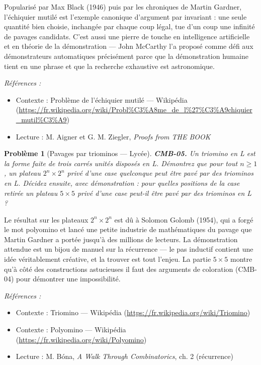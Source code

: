 \documentclass[11pt]{article}
\newtheorem{problem}{Problème}
\newenvironment{refs}{\par\small\noindent\emph{Références :}\begin{itemize}\setlength\itemsep{0pt}}{\end{itemize}\normalsize}
\begin{document}
\noindent Popularisé par Max Black (1946) puis par les chroniques de Martin Gardner,
l'échiquier mutilé est l'exemple canonique d'argument par invariant : une seule quantité bien
choisie, inchangée par chaque coup légal, tue d'un coup une infinité de pavages candidats. C'est
aussi une pierre de touche en intelligence artificielle et en théorie de la démonstration --- John
McCarthy l'a proposé comme défi aux démonstrateurs automatiques précisément parce que la
démonstration humaine tient en une phrase et que la recherche exhaustive est astronomique.

\begin{refs}
\item Contexte : Problème de l'échiquier mutilé --- Wikipédia (\url{https://fr.wikipedia.org/wiki/Probl%C3%A8me_de_l%27%C3%A9chiquier_mutil%C3%A9})
\item Lecture : M. Aigner et G. M. Ziegler, \textit{Proofs from THE BOOK}
\end{refs}

\bigskip

\begin{problem}[{Pavages par triominos --- Lycée}]
\textbf{CMB-05.} Un triomino en L est la forme faite de trois carrés unités
disposés en L. Démontrez que pour tout $ n \ge 1 $, un plateau $ 2^n \times 2^n $ privé d'une
case quelconque peut être pavé par des triominos en L. Décidez ensuite, avec démonstration : pour
quelles positions de la case retirée un plateau $ 5 \times 5 $ privé d'une case peut-il être
pavé par des triominos en L ?
\end{problem}

\noindent Le résultat sur les plateaux $ 2^n \times 2^n $ est dû à Solomon Golomb
(1954), qui a forgé le mot \og{} polyomino \fg{} et lancé une petite industrie de mathématiques du pavage
que Martin Gardner a portée jusqu'à des millions de lecteurs. La démonstration attendue est un
bijou de manuel sur la récurrence --- le pas inductif contient une idée véritablement créative, et
la trouver est tout l'enjeu. La partie $ 5 \times 5 $ montre qu'à côté des constructions
astucieuses il faut des arguments de coloration (CMB-04) pour démontrer une impossibilité.

\begin{refs}
\item Contexte : Triomino --- Wikipédia (\url{https://fr.wikipedia.org/wiki/Triomino})
\item Contexte : Polyomino --- Wikipédia (\url{https://fr.wikipedia.org/wiki/Polyomino})
\item Lecture : M. Bóna, \textit{A Walk Through Combinatorics}, ch. 2 (récurrence)
\end{refs}
\end{document}
